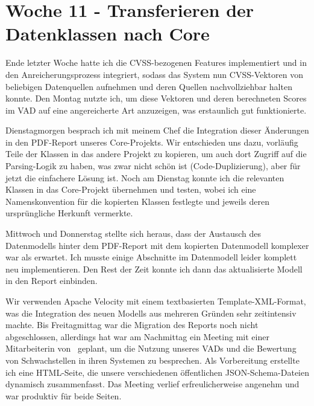 \section{Woche 11 - Transferieren der Datenklassen nach Core} \label{sec:bericht-wo-11}


\lweekdaymarginpar{\weekdayMondayLong}

Ende letzter Woche hatte ich die CVSS-bezogenen Features implementiert und in den Anreicherungsprozess integriert, sodass das System nun CVSS-Vektoren von beliebigen Datenquellen aufnehmen und deren Quellen nachvollziehbar halten konnte.
Den Montag nutzte ich, um diese Vektoren und deren berechneten Scores im VAD auf eine angereicherte Art anzuzeigen, was erstaunlich gut funktionierte.

\sweekdaymarginpar{\weekdayTuesdayLong}

Dienstagmorgen besprach ich mit meinem Chef die Integration dieser Änderungen in den PDF-Report unseres Core-Projekts.
Wir entschieden uns dazu, vorläufig Teile der Klassen in das andere Projekt zu kopieren, um auch dort Zugriff auf die Parsing-Logik zu haben, was zwar nicht schön ist (Code-Duplizierung), aber für jetzt die einfachere Lösung ist.
Noch am Dienstag konnte ich die relevanten Klassen in das Core-Projekt übernehmen und testen, wobei ich eine Namenskonvention für die kopierten Klassen festlegte und jeweils deren ursprüngliche Herkunft vermerkte.

\sweekdaymarginpar{\weekdayWednesdayShort, \weekdayThursdayShort, \weekdayFridayShort}

Mittwoch und Donnerstag stellte sich heraus, dass der Austausch des Datenmodells hinter dem PDF-Report mit dem kopierten Datenmodell komplexer war als erwartet.
Ich musste einige Abschnitte im Datenmodell leider komplett neu implementieren.
Den Rest der Zeit konnte ich dann das aktualisierte Modell in den Report einbinden.

Wir verwenden Apache Velocity mit einem textbasierten Template-XML-Format, was die Integration des neuen Modells aus mehreren Gründen sehr zeitintensiv machte.
Bis Freitagmittag war die Migration des Reports noch nicht abgeschlossen, allerdings hat war am Nachmittag ein Meeting mit einer Mitarbeiterin von \aeclientZEZESE\ geplant, um die Nutzung unseres VADs und die Bewertung von Schwachstellen in ihren Systemen zu besprechen.
Als Vorbereitung erstellte ich eine HTML-Seite, die unsere verschiedenen öffentlichen JSON-Schema-Dateien dynamisch zusammenfasst.
Das Meeting verlief erfreulicherweise angenehm und war produktiv für beide Seiten.

